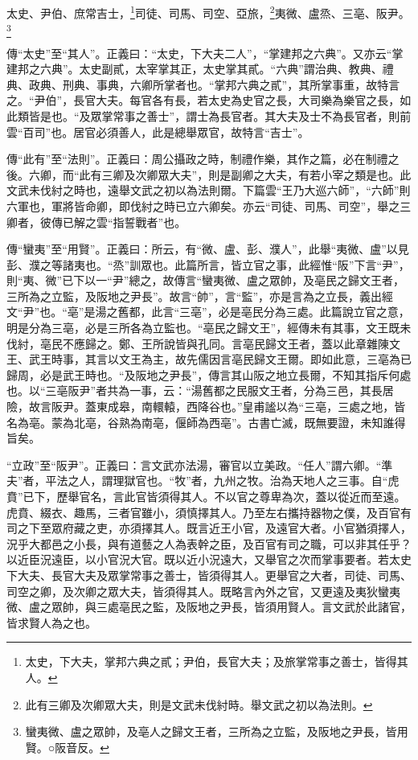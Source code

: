 太史、尹伯、庶常吉士，\footnote{太史，下大夫，掌邦六典之貳；尹伯，長官大夫；及旅掌常事之善士，皆得其人。}司徒、司馬、司空、亞旅，\footnote{此有三卿及次卿眾大夫，則是文武未伐紂時。舉文武之初以為法則。}夷微、盧烝、三亳、阪尹。\footnote{蠻夷微、盧之眾帥，及亳人之歸文王者，三所為之立監，及阪地之尹長，皆用賢。○阪音反。}

{\noindent\zhuan{}\fzbyks 傳“太史”至“其人”。正義曰：“太史，下大夫二人”，“掌建邦之六典”。又亦云“掌建邦之六典”。太史副貳，太宰掌其正，太史掌其貳。“六典”謂治典、教典、禮典、政典、刑典、事典，六卿所掌者也。“掌邦六典之貳”，其所掌事重，故特言之。“尹伯”，長官大夫。每官各有長，若太史為史官之長，大司樂為樂官之長，如此類皆是也。“及眾掌常事之善士”，謂士為長官者。其大夫及士不為長官者，則前雲“百司”也。居官必須善人，此是總舉眾官，故特言“吉士”。 \par}

{\noindent\zhuan{}\fzbyks 傳“此有”至“法則”。正義曰：周公攝政之時，制禮作樂，其作之篇，必在制禮之後。六卿，而“此有三卿及次卿眾大夫”，則是副卿之大夫，有若小宰之類是也。此文武未伐紂之時也，遠舉文武之初以為法則爾。下篇雲“王乃大巡六師”，“六師”則六軍也，軍將皆命卿，即伐紂之時已立六卿矣。亦云“司徒、司馬、司空”，舉之三卿者，彼傳已解之雲“指誓戰者”也。 \par}

{\noindent\zhuan{}\fzbyks 傳“蠻夷”至“用賢”。正義曰：所云，有“微、盧、彭、濮人”，此舉“夷微、盧”以見彭、濮之等諸夷也。“烝”訓眾也。此篇所言，皆立官之事，此經惟“阪”下言“尹”，則“夷、微”已下以一“尹”總之，故傳言“蠻夷微、盧之眾帥，及亳民之歸文王者，三所為之立監，及阪地之尹長”。故言“帥”，言“監”，亦是言為之立長，義出經文“尹”也。“亳”是湯之舊都，此言“三亳”，必是亳民分為三處。此篇說立官之意，明是分為三亳，必是三所各為立監也。“亳民之歸文王”，經傳未有其事，文王既未伐紂，亳民不應歸之。鄭、王所說皆與孔同。言亳民歸文王者，蓋以此章雜陳文王、武王時事，其言以文王為主，故先儒因言亳民歸文王爾。即如此意，三亳為已歸周，必是武王時也。“及阪地之尹長”，傳言其山阪之地立長爾，不知其指斥何處也。以“三亳阪尹”者共為一事，云：“湯舊都之民服文王者，分為三邑，其長居險，故言阪尹。蓋東成皋，南轘轅，西降谷也。”皇甫謐以為“三亳，三處之地，皆名為亳。蒙為北亳，谷熟為南亳，偃師為西亳”。古書亡滅，既無要證，未知誰得旨矣。 \par}

{\noindent\shu{}\fzkt “立政”至“阪尹”。正義曰：言文武亦法湯，審官以立美政。“任人”謂六卿。“準夫”者，平法之人，謂理獄官也。“牧”者，九州之牧。治為天地人之三事。自“虎賁”已下，歷舉官名，言此官皆須得其人。不以官之尊卑為次，蓋以從近而至遠。虎賁、綴衣、趣馬，三者官雖小，須慎擇其人。乃至左右攜持器物之僕，及百官有司之下至眾府藏之吏，亦須擇其人。既言近王小官，及遠官大者。小官猶須擇人，況乎大都邑之小長，與有道藝之人為表幹之臣，及百官有司之職，可以非其任乎？以近臣況遠臣，以小官況大官。既以近小況遠大，又舉官之次而掌事要者。若太史下大夫、長官大夫及眾掌常事之善士，皆須得其人。更舉官之大者，司徒、司馬、司空之卿，及次卿之眾大夫，皆須得其人。既略言內外之官，又更遠及夷狄蠻夷微、盧之眾帥，與三處亳民之監，及阪地之尹長，皆須用賢人。言文武於此諸官，皆求賢人為之也。 \par}

